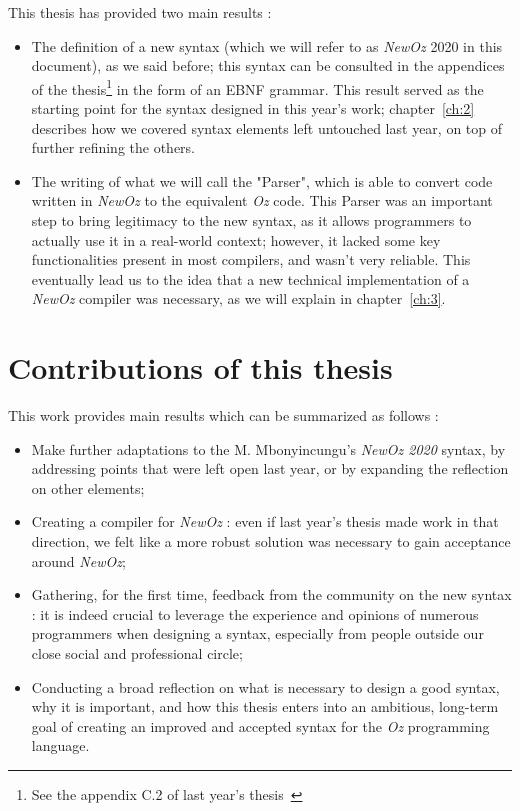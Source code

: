This thesis has provided two main results :
\begin{itemize}
    \item The definition of a new syntax (which we will refer to as \textit{NewOz} 2020 in this document), as we said before;
    this syntax can be consulted in the appendices of the thesis\footnote{See the appendix C.2 of last year's thesis~\cite{jpthesis}} in the form of an EBNF grammar.
    This result served as the starting point for the syntax designed in this year's work;
    chapter~\ref{ch:2} describes how we covered syntax elements left untouched last year, on top of further refining the others.
    \item The writing of what we will call the "Parser", which is able to convert code written in \textit{NewOz} to the equivalent \textit{Oz} code.
    This Parser was an important step to bring legitimacy to the new syntax, as it allows programmers to actually use it in a real-world context;
    however, it lacked some key functionalities present in most compilers, and wasn't very reliable.
    This eventually lead us to the idea that a new technical implementation of a \textit{NewOz} compiler was necessary, as we will explain in chapter~\ref{ch:3}.
\end{itemize}

\section{Contributions of this thesis}\label{sec:ch1-3}
This work provides  main results which can be summarized as follows :
\begin{itemize}
    \item Make further adaptations to the M. Mbonyincungu's \textit{NewOz 2020} syntax, by addressing points that were left open last year, or by expanding the reflection on other elements;
    \item Creating a compiler for \textit{NewOz} : even if last year's thesis made work in that direction, we felt like a more robust solution was necessary to gain acceptance around \textit{NewOz};
    \item Gathering, for the first time, feedback from the community on the new syntax : it is indeed crucial to leverage the experience and opinions of numerous programmers when designing a syntax, especially from people outside our close social and professional circle;
    \item Conducting a broad reflection on what is necessary to design a good syntax, why it is important, and how this thesis enters into an ambitious, long-term goal of creating an improved and accepted syntax for the \textit{Oz} programming language.
\end{itemize}

